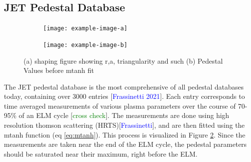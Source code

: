 \documentclass[a4paper, twoside, final, 12pt]{article}
\begin{document}

\subsection{JET Pedestal Database}
\begin{figure}
	\centering
	\begin{subfigure}{0.495\linewidth}
		\centering
		\texttt{[image: example-image-a]}
		\caption{}
		\label{subfig:plasmashaping}
	\end{subfigure}
	\begin{subfigure}{0.495\linewidth}
		\centering
		\texttt{[image: example-image-b]}
		\caption{}
		\label{subfig:ped_fit}
	\end{subfigure}\hfill
	\caption{(a) shaping figure showing r,a, triangularity and such (b) Pedestal Values before mtanh fit}
	\label{fig:pedestal_db_figs}
\end{figure}

The JET pedestal database is the most comprehensive of all pedestal databases today, containing over 3000 entries [\textcolor{blue}{Frassinetti 2021}].
Each entry corresponds to time averaged measurements of various plasma parameters over the course of 70-95\% of an ELM cycle [\textcolor{green}{cross check}].
The measurements are done using high resolution thomson scattering (HRTS)[\textcolor{blue}{Frassinetti}], and are then fitted using the mtanh function (eq \ref{eq:mtanh}). This process is visualized in Figure \ref{subfig:ped_fit}. 
Since the measurements are taken near the end of the ELM cycle, the pedestal parameters should be saturated near their maximum, right before the ELM.
\end{document}
